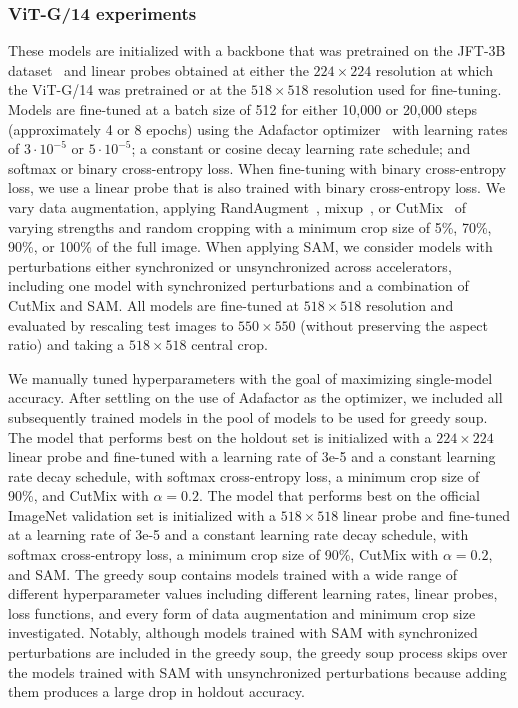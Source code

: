 \documentclass[nohyperref]{article}
\theoremstyle{plain}
\theoremstyle{definition}
\theoremstyle{remark}
\begin{document}
    \subsubsection{ViT-G/14 experiments}
    \label{app:vitgdetails}
    These models are initialized with a backbone that was pretrained on the JFT-3B dataset~\cite{zhai2021scaling} and linear probes obtained at either the $224\times 224$ resolution at which the ViT-G/14 was pretrained or at the $518\times 518$ resolution used for fine-tuning. Models are fine-tuned at a batch size of 512 for either 10,000 or 20,000 steps (approximately 4 or 8 epochs) using the Adafactor optimizer~\cite{shazeer2018adafactor} with learning rates of $3 \cdot 10^{-5}$ or $5 \cdot 10^{-5}$; a constant or cosine decay learning rate schedule; and softmax or binary cross-entropy loss. When fine-tuning with binary cross-entropy loss, we use a linear probe that is also trained with binary cross-entropy loss. We vary data augmentation, applying RandAugment~\cite{cubuk2020randaugment}, mixup~\cite{zhang2017mixup}, or CutMix~\cite{yun2019cutmix} of varying strengths and random cropping with a minimum crop size of 5\%, 70\%, 90\%, or 100\% of the full image.  When applying SAM, we consider models with perturbations either synchronized or unsynchronized across accelerators, including one model with synchronized perturbations and a combination of CutMix and SAM. All models are fine-tuned at $518 \times 518$ resolution and evaluated by rescaling test images to $550 \times 550$ (without preserving the aspect ratio) and taking a $518 \times 518$ central crop.
    
    We manually tuned hyperparameters with the goal of maximizing single-model accuracy. After settling on the use of Adafactor as the optimizer, we included all subsequently trained models in the pool of models to be used for greedy soup. The model that performs best on the holdout set is initialized with a $224\times 224$ linear probe and fine-tuned with a learning rate of 3e-5 and a constant learning rate decay schedule, with softmax cross-entropy loss, a minimum crop size of 90\%, and CutMix with $\alpha = 0.2$. The model that performs best on the official ImageNet validation set is initialized with a $518\times 518$ linear probe and fine-tuned at a learning rate of 3e-5 and a constant learning rate decay schedule, with softmax cross-entropy loss, a minimum crop size of 90\%, CutMix with $\alpha = 0.2$, and SAM. The greedy soup contains models trained with a wide range of different hyperparameter values including different learning rates, linear probes, loss functions, and every form of data augmentation and minimum crop size investigated. Notably, although models trained with SAM with synchronized perturbations are included in the greedy soup, the greedy soup process skips over the models trained with SAM with unsynchronized perturbations because adding them produces a large drop in holdout accuracy.
    
\end{document}
